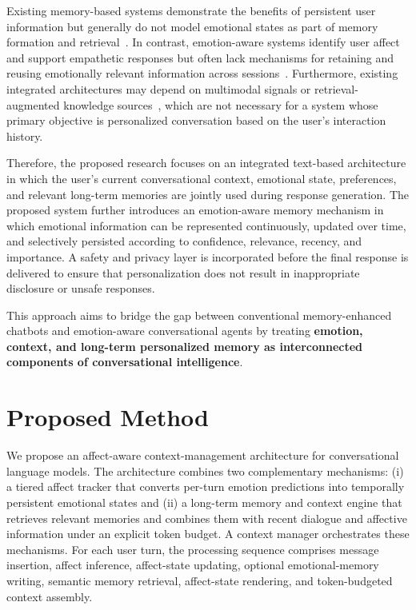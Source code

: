\documentclass[graybox]{svmult}
\begin{document}
Existing memory-based systems demonstrate the benefits of persistent user information but generally do not model emotional states as part of memory formation and retrieval~\cite{zhong2024memorybank,packer2023memgpt,park2023generative,xu2025amem}. In contrast, emotion-aware systems identify user affect and support empathetic responses but often lack mechanisms for retaining and reusing emotionally relevant information across sessions~\cite{rashkin2019empathetic,liu2021esconv,majumder2019dialoguernn}. Furthermore, existing integrated architectures may depend on multimodal signals or retrieval-augmented knowledge sources~\cite{Abinaya2025,Devi2026,Raghav2026}, which are not necessary for a system whose primary objective is personalized conversation based on the user's interaction history.

Therefore, the proposed research focuses on an integrated text-based architecture in which the user's current conversational context, emotional state, preferences, and relevant long-term memories are jointly used during response generation. The proposed system further introduces an emotion-aware memory mechanism in which emotional information can be represented continuously, updated over time, and selectively persisted according to confidence, relevance, recency, and importance. A safety and privacy layer is incorporated before the final response is delivered to ensure that personalization does not result in inappropriate disclosure or unsafe responses.

This approach aims to bridge the gap between conventional memory-enhanced chatbots and emotion-aware conversational agents by treating \textbf{emotion, context, and long-term personalized memory as interconnected components of conversational intelligence}.



\section{Proposed Method}
\label{sec:methodology}

We propose an affect-aware context-management architecture for conversational language models. The architecture combines two complementary mechanisms: (i) a tiered affect tracker that converts per-turn emotion predictions into temporally persistent emotional states and (ii) a long-term memory and context engine that retrieves relevant memories and combines them with recent dialogue and affective information under an explicit token budget. A context manager orchestrates these mechanisms. For each user turn, the processing sequence comprises message insertion, affect inference, affect-state updating, optional emotional-memory writing, semantic memory retrieval, affect-state rendering, and token-budgeted context assembly.
\end{document}
